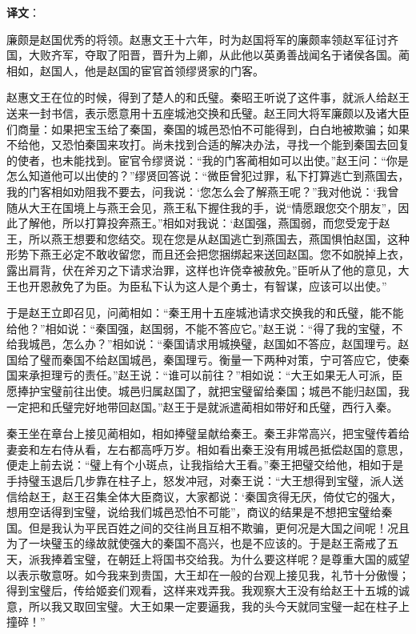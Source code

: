 \documentclass[12pt,UTF-8,openany]{ctexbook}
\begin{document}
\newpage

\textbf{译文}：

\vspace{1em}

\begin{normalsize}
    
    廉颇是赵国优秀的将领。赵惠文王十六年，时为赵国将军的廉颇率领赵军征讨齐国，大败齐军，夺取了阳晋，晋升为上卿，从此他以英勇善战闻名于诸侯各国。蔺相如，赵国人，他是赵国的宦官首领缪贤家的门客。
    
    赵惠文王在位的时候，得到了楚人的和氏璧。秦昭王听说了这件事，就派人给赵王送来一封书信，表示愿意用十五座城池交换和氏璧。赵王同大将军廉颇以及诸大臣们商量：如果把宝玉给了秦国，秦国的城邑恐怕不可能得到，白白地被欺骗；如果不给他，又恐怕秦国来攻打。尚未找到合适的解决办法，寻找一个能到秦国去回复的使者，也未能找到。宦官令缪贤说：“我的门客蔺相如可以出使。”赵王问：“你是怎么知道他可以出使的？”缪贤回答说：“微臣曾犯过罪，私下打算逃亡到燕国去，我的门客相如劝阻我不要去，问我说：‘您怎么会了解燕王呢？”我对他说：‘我曾随从大王在国境上与燕王会见，燕王私下握住我的手，说“情愿跟您交个朋友”，因此了解他，所以打算投奔燕王。”相如对我说：‘赵国强，燕国弱，而您受宠于赵王，所以燕王想要和您结交。现在您是从赵国逃亡到燕国去，燕国惧怕赵国，这种形势下燕王必定不敢收留您，而且还会把您捆绑起来送回赵国。您不如脱掉上衣，露出肩背，伏在斧刃之下请求治罪，这样也许侥幸被赦免。”臣听从了他的意见，大王也开恩赦免了为臣。为臣私下认为这人是个勇士，有智谋，应该可以出使。”
    
    于是赵王立即召见，问蔺相如：“秦王用十五座城池请求交换我的和氏璧，能不能给他？”相如说：“秦国强，赵国弱，不能不答应它。”赵王说：“得了我的宝璧，不给我城邑，怎么办？”相如说：“秦国请求用城换璧，赵国如不答应，赵国理亏。赵国给了璧而秦国不给赵国城邑，秦国理亏。衡量一下两种对策，宁可答应它，使秦国来承担理亏的责任。”赵王说：“谁可以前往？”相如说：“大王如果无人可派，臣愿捧护宝璧前往出使。城邑归属赵国了，就把宝璧留给秦国；城邑不能归赵国，我一定把和氏璧完好地带回赵国。”赵王于是就派遣蔺相如带好和氏璧，西行入秦。
    
    秦王坐在章台上接见蔺相如，相如捧璧呈献给秦王。秦王非常高兴，把宝璧传着给妻妾和左右侍从看，左右都高呼万岁。相如看出秦王没有用城邑抵偿赵国的意思，便走上前去说：“璧上有个小斑点，让我指给大王看。”秦王把璧交给他，相如于是手持璧玉退后几步靠在柱子上，怒发冲冠，对秦王说：“大王想得到宝璧，派人送信给赵王，赵王召集全体大臣商议，大家都说：‘秦国贪得无厌，倚仗它的强大，想用空话得到宝璧，说给我们城邑恐怕不可能”，商议的结果是不想把宝璧给秦国。但是我认为平民百姓之间的交往尚且互相不欺骗，更何况是大国之间呢！况且为了一块璧玉的缘故就使强大的秦国不高兴，也是不应该的。于是赵王斋戒了五天，派我捧着宝璧，在朝廷上将国书交给我。为什么要这样呢？是尊重大国的威望以表示敬意呀。如今我来到贵国，大王却在一般的台观上接见我，礼节十分傲慢；得到宝璧后，传给姬妾们观看，这样来戏弄我。我观察大王没有给赵王十五城的诚意，所以我又取回宝璧。大王如果一定要逼我，我的头今天就同宝璧一起在柱子上撞碎！”
    

\end{normalsize}
\end{document}
